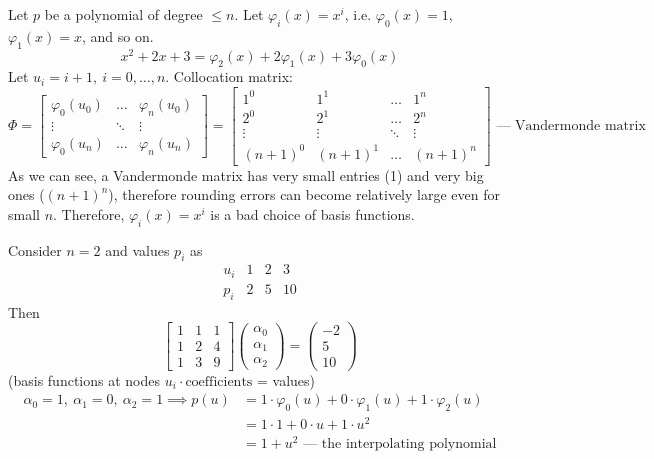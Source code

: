 \begin{example}
    Let $p$ be a polynomial of degree $\le n$.
    Let $\varphi_i(x) = x^{i}$, i.e. $\varphi_0(x) = 1$, 
    $\varphi_1(x) = x$, and so on.
    \[
        x^2 + 2x + 3 = \varphi_2(x) + 2 \varphi_1(x) + 3 \varphi_0(x)
    \]
    Let $u_i = i + 1,\ i = 0, \dots, n$.
    Collocation matrix:
    \[
        \Phi = \begin{bmatrix}
            \varphi_0(u_0) & \dots & \varphi_n(u_0)\\
            \vdots & \ddots & \vdots\\
            \varphi_0(u_n) & \dots & \varphi_n(u_n)
        \end{bmatrix} = 
        \begin{bmatrix}
            1^0 & 1^1 & \dots & 1^n\\
            2^0 & 2^1 & \dots & 2^n\\
            \vdots & \vdots & \ddots & \vdots\\
            (n + 1)^0 & (n + 1)^1 & \dots & (n + 1)^n
        \end{bmatrix}
        \text{ --- Vandermonde matrix}
    \]
    As we can see, a Vandermonde matrix has very small entries (1)
    and very big ones ($(n + 1)^n$), therefore
    rounding errors can become relatively large even for small $n$.
    Therefore, $\varphi_i(x) = x^{i}$ is a bad choice of basis functions.

    Consider $n = 2$ and values $p_i$ as
    \[
        \begin{array}{c|c|c|c}
            u_i & 1 & 2 & 3\\
            \hline
            p_i & 2 & 5 & 10
        \end{array}
    \]
    Then
    \[
        \begin{bmatrix}
            1 & 1 & 1\\
            1 & 2 & 4\\
            1 & 3 & 9
        \end{bmatrix}
        \begin{pmatrix}
            \alpha_0 \\ \alpha_1 \\ \alpha_2
        \end{pmatrix} = \begin{pmatrix}
            -2 \\ 5 \\ 10
        \end{pmatrix}
    \]
    (basis functions at nodes $u_i \cdot \text{coefficients}$ = values)
    \begin{align*}
        \alpha_0 = 1,\ \alpha_1 = 0,\ \alpha_2 = 1 \implies
        p(u) &= 1 \cdot \varphi_0(u) + 0 \cdot \varphi_1(u) + 1 \cdot \varphi_2(u)
        \\&= 1 \cdot 1 + 0 \cdot u + 1 \cdot u^2
        \\&= 1 + u^2 \text{ --- the interpolating polynomial}
    \end{align*}
\end{example}

